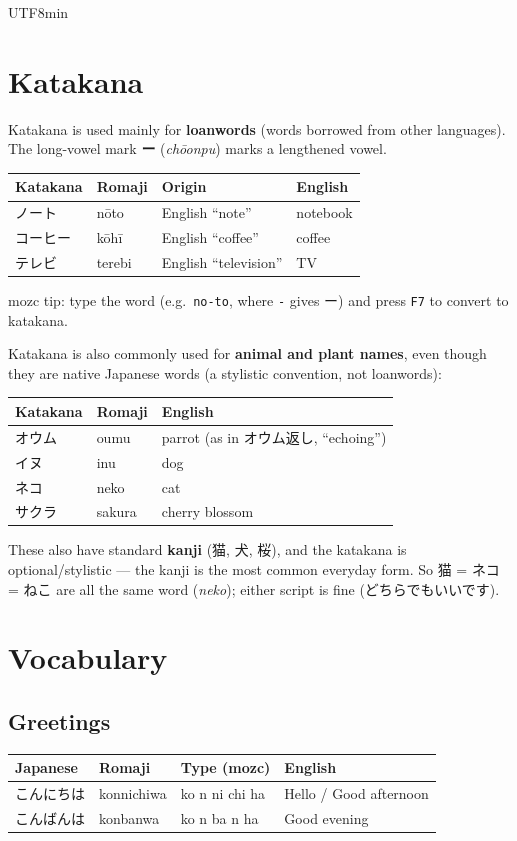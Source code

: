 \documentclass[11pt]{article}
\begin{document}
\begin{CJK}{UTF8}{min}
\section{Katakana}
Katakana is used mainly for \textbf{loanwords} (words borrowed from other
languages). The long-vowel mark \textbf{ー} (\emph{chōonpu}) marks a lengthened
vowel.
\begin{center}
\begin{tabular}{@{}llll@{}}
\toprule
Katakana & Romaji & Origin & English \\
\midrule
ノート   & nōto   & English ``note''       & notebook \\
コーヒー & kōhī   & English ``coffee''     & coffee \\
テレビ   & terebi & English ``television'' & TV \\
\bottomrule
\end{tabular}
\end{center}
mozc tip: type the word (e.g.\ \texttt{no-to}, where \texttt{-} gives ー) and
press \texttt{F7} to convert to katakana.

Katakana is also commonly used for \textbf{animal and plant names}, even though
they are native Japanese words (a stylistic convention, not loanwords):
\begin{center}
\begin{tabular}{@{}lll@{}}
\toprule
Katakana & Romaji & English \\
\midrule
オウム & oumu  & parrot (as in オウム返し, ``echoing'') \\
イヌ   & inu   & dog \\
ネコ   & neko  & cat \\
サクラ & sakura & cherry blossom \\
\bottomrule
\end{tabular}
\end{center}
These also have standard \textbf{kanji} (猫, 犬, 桜), and the katakana is
optional/stylistic --- the kanji is the most common everyday form. So
猫 = ネコ = ねこ are all the same word (\emph{neko}); either script is fine
(どちらでもいいです).

\section{Vocabulary}

\subsection{Greetings}
\begin{center}
\begin{tabular}{@{}llll@{}}
\toprule
Japanese & Romaji & Type (mozc) & English \\
\midrule
こんにちは & konnichiwa & ko n ni chi ha & Hello / Good afternoon \\
こんばんは & konbanwa   & ko n ba n ha  & Good evening \\
\bottomrule
\end{tabular}
\end{center}


\end{CJK}
\end{document}
